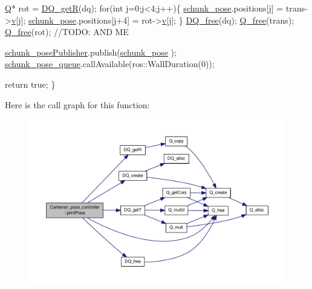 \begin{DoxyCode}
        \hyperlink{structQ}{Q}* rot = \hyperlink{dualquaternion_8h_a35b3966af2f77ad5a8f47126948720fb}{DQ\_getR}(dq);
        \textcolor{keywordflow}{for}(\textcolor{keywordtype}{int} j=0;j<4;j++)\{
                \hyperlink{classCartesian__pose__controller_a301bc44e901e4837cf036661478354c4}{schunk\_pose}.positions[j]   = trans->\hyperlink{structQ_a2a0074b583999340d42804e4c1141ac4}{v}[j];
                \hyperlink{classCartesian__pose__controller_a301bc44e901e4837cf036661478354c4}{schunk\_pose}.positions[j+4] = rot->\hyperlink{structQ_a2a0074b583999340d42804e4c1141ac4}{v}[j];
        \}
        \hyperlink{dualquaternion_8h_a1d21b6cb665c04de4be5aca50804caf4}{DQ\_free}(dq);
        \hyperlink{quaternion_8h_a69ecc76f665022f81be1702c20865de4}{Q\_free}(trans);
        \hyperlink{quaternion_8h_a69ecc76f665022f81be1702c20865de4}{Q\_free}(rot);
        \textcolor{comment}{//TODO: AND ME}

        \hyperlink{classCartesian__pose__controller_a9eb38e771e5006950b9a8075a0ea7e49}{schunk\_posePublisher}.publish(\hyperlink{classCartesian__pose__controller_a301bc44e901e4837cf036661478354c4}{schunk\_pose}
      );
        \hyperlink{classCartesian__pose__controller_a5efe52a57e5239b3fd86ff456e94691b}{schunk\_pose\_queue}.callAvailable(ros::WallDuration(0));

        \textcolor{keywordflow}{return} \textcolor{keyword}{true};
\}
\end{DoxyCode}


Here is the call graph for this function\-:\nopagebreak
\begin{figure}[H]
\begin{center}
\leavevmode
\includegraphics[width=350pt]{classCartesian__pose__controller_ab55ab40074c82ba8cc010fe68fc76d5b_cgraph}
\end{center}
\end{figure}




